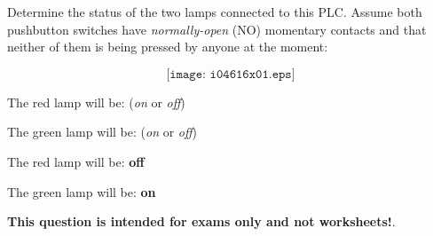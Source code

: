 

Determine the status of the two lamps connected to this PLC.  Assume both pushbutton switches have {\it normally-open} (NO) momentary contacts and that neither of them is being pressed by anyone at the moment:

$$\texttt{[image: i04616x01.eps]}$$

\vskip 10pt

The red lamp will be: ({\it on} or {\it off})

\vskip 10pt

The green lamp will be: ({\it on} or {\it off})







The red lamp will be: {\bf off}

\vskip 10pt

The green lamp will be: {\bf on}







{\bf This question is intended for exams only and not worksheets!}.



